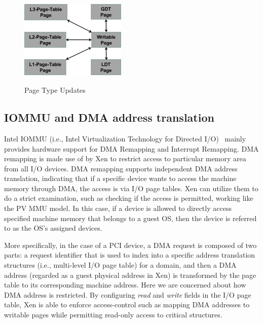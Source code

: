 
\begin{figure}[ht]
\centering
\includegraphics[width=0.45\textwidth]{image/background/page-type-updates.png} \\
\caption{Page Type Updates}
\label{fig:page-type-updates}
\end{figure}


\subsection{IOMMU and DMA address translation}
Intel IOMMU (i.e., Intel Virtualization Technology for Directed I/O)~\cite{intelvt} mainly provides hardware support for DMA Remapping and Interrupt Remapping. DMA remapping is made use of by Xen to restrict access to particular memory area from all I/O devices. DMA remapping supports independent DMA address translation, indicating that if a specific device wants to access the machine memory through DMA, the access is via I/O page tables. Xen can utilize them to do a strict examination, such as checking if the access is permitted, working like the PV MMU model. In this case, if a device is allowed to directly access specified machine memory that belongs to a guest OS, then the device is referred to as the OS's assigned devices.

More specifically, in the case of a PCI device, a DMA request is composed of two parts: a request identifier that is used to index into a specific address translation structures (i.e., multi-level I/O page table) for a domain, and then a DMA address (regarded as a guest physical address in Xen) is transformed by the page table to its corresponding machine address. Here we are concerned about how DMA address is restricted. By configuring \emph{read} and \emph{write} fields in the I/O page table, Xen is able to enforce access-control such as mapping DMA addresses to writable pages while permitting read-only access to critical structures.

